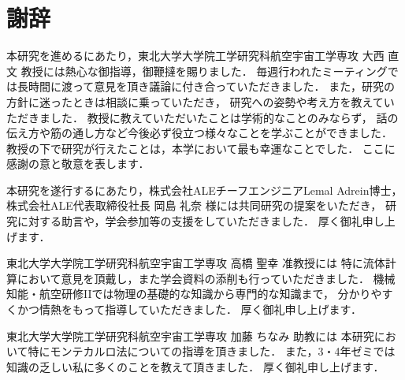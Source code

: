\chapter{謝辞}

本研究を進めるにあたり，東北大学大学院工学研究科航空宇宙工学専攻 大西 直文 教授には熱心な御指導，御鞭撻を賜りました．
毎週行われたミーティングでは長時間に渡って意見を頂き議論に付き合っていただきました．
また，研究の方針に迷ったときは相談に乗っていただき，
研究への姿勢や考え方を教えていただきました．
教授に教えていただいたことは学術的なことのみならず，
話の伝え方や筋の通し方など今後必ず役立つ様々なことを学ぶことができました．
教授の下で研究が行えたことは，本学において最も幸運なことでした．
ここに感謝の意と敬意を表します．

本研究を遂行するにあたり，株式会社ALEチーフエンジニアLemal Adrein博士，
株式会社ALE代表取締役社長 岡島 礼奈 様には共同研究の提案をいただき，
研究に対する助言や，学会参加等の支援をしていただきました．
厚く御礼申し上げます．

東北大学大学院工学研究科航空宇宙工学専攻 高橋 聖幸 准教授には
特に流体計算において意見を頂戴し，また学会資料の添削も行っていただきました．
機械知能・航空研修IIでは物理の基礎的な知識から専門的な知識まで，
分かりやすくかつ情熱をもって指導していただきました．
厚く御礼申し上げます．

東北大学大学院工学研究科航空宇宙工学専攻 加藤 ちなみ 助教には
本研究において特にモンテカルロ法についての指導を頂きました．
また，3・4年ゼミでは知識の乏しい私に多くのことを教えて頂きました．
厚く御礼申し上げます．

